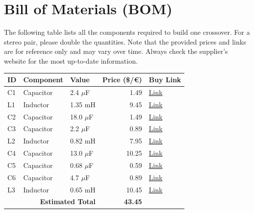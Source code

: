 \documentclass[11pt,a4paper]{report}
\begin{document}
\chapter{Bill of Materials (BOM)}
The following table lists all the components required to build one crossover. For a stereo pair, please double the quantities. Note that the provided prices and links are for reference only and may vary over time. Always check the supplier's website for the most up-to-date information.

\vspace{0.5cm}
\begin{table}[H]
    \centering
    \renewcommand{\arraystretch}{1.5}
    \begin{tabular}{@{}lllrl@{}}
        \toprule
        \textbf{ID} & \textbf{Component} & \textbf{Value} & \textbf{Price (\$/€)} & \textbf{Buy Link} \\
        \midrule
        C1 & Capacitor & 2.4 $\mu$F & 1.49 & \href{https://www.soundimports.eu/en/jantzen-audio-001-0239.html}{Link} \\
        L1 & Inductor & 1.35 mH & 9.45 & \href{https://www.soundimports.eu/en/jantzen-audio-000-5420.html}{Link} \\
        C2 & Capacitor & 18.0 $\mu$F & 1.49 & \href{https://www.soundimports.eu/en/jantzen-audio-001-6144.html}{Link} \\
        C3 & Capacitor & 2.2 $\mu$F & 0.89 & \href{https://www.parts-express.com/2.2uF-100V-Non-Polarized-Capacitor-027-324}{Link} \\
        L2 & Inductor & 0.82 mH & 7.95 & \href{https://www.soundimports.eu/en/jantzen-audio-000-2192.html}{Link} \\
        C4 & Capacitor & 13.0 $\mu$F & 10.25 & \href{https://www.soundimports.eu/en/audyn-q4-13-0-400.html}{Link} \\
        C5 & Capacitor & 0.68 $\mu$F & 0.59 & \href{https://www.parts-express.com/Dayton-Audio-DMPC-0.68-0.68uF-250V-Polypropylene-Capacitor-027-408}{Link} \\
        C6 & Capacitor & 4.7 $\mu$F & 0.89 & \href{https://www.parts-express.com/4.7uF-100V-Non-Polarized-Capacitor-027-332}{Link} \\
        L3 & Inductor & 0.65 mH & 10.45 & \href{https://www.soundimports.eu/en/jantzen-audio-000-1952.html}{Link} \\
        \midrule
        \multicolumn{3}{r}{\textbf{Estimated Total}} & \textbf{43.45} & \\
        \bottomrule
    \end{tabular}
\end{table}
\end{document}

